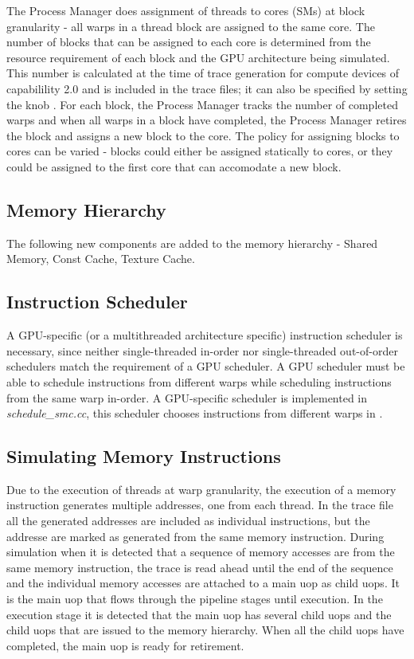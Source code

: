 The Process Manager does assignment of threads to cores (SMs) at block
granularity - all warps in a thread block are assigned to the same core. The
number of blocks that can be assigned to each core is determined from the
resource requirement of each block and the GPU architecture being simulated.
This number is calculated at the time of trace generation for compute devices
of capabilility 2.0 and is included in the trace files; it can also be
specified by setting the knob .  For each block, the Process
Manager tracks the number of completed warps and when all warps in a block have
completed, the Process Manager retires the block and assigns a new block to the
core. The policy for assigning blocks to cores can be varied - blocks could
either be assigned statically to cores, or they could be assigned to the first
core that can accomodate a new block.


\subsection{Memory Hierarchy}

The following new components are added to the memory hierarchy - Shared Memory,
    Const Cache, Texture Cache.

\subsection{Instruction Scheduler}

A GPU-specific (or a multithreaded architecture specific) instruction scheduler
is necessary, since neither single-threaded in-order nor single-threaded
out-of-order schedulers match the requirement of a GPU scheduler. A GPU
scheduler must be able to schedule instructions from different warps while
scheduling instructions from the same warp in-order. A GPU-specific scheduler
is implemented in \textit{schedule\_smc.cc}, this scheduler chooses
instructions from different warps in .

\subsection{Simulating Memory Instructions}

Due to the execution of threads at warp granularity, the execution of a memory
instruction generates multiple addresses, one from each thread. In the trace
file all the generated addresses are included as individual instructions, but
the addresse are marked as generated from the same memory instruction. During
simulation when it is detected that a sequence of memory accesses are from the
same memory instruction, the trace is read ahead until the end of the sequence
and the individual memory accesses are attached to a main uop as child uops. It
is the main uop that flows through the pipeline stages until execution. In the
execution stage it is detected that the main uop has several child uops and the
child uops that are issued to the memory hierarchy. When all the child uops
have completed, the main uop is ready for retirement.



